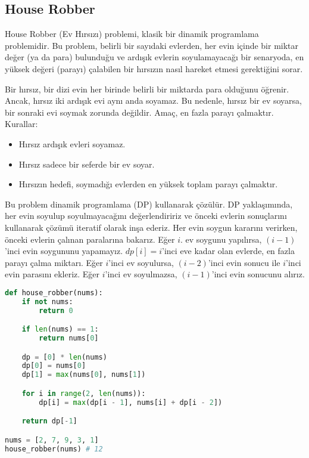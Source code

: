 \newpage

\subsection{House Robber}

House Robber (Ev Hırsızı) problemi, klasik bir dinamik programlama problemidir. Bu problem, belirli bir sayıdaki evlerden, her evin içinde bir miktar değer (ya da para) bulunduğu ve ardışık evlerin soyulamayacağı bir senaryoda, en yüksek değeri (parayı) çalabilen bir hırsızın nasıl hareket etmesi gerektiğini sorar.

Bir hırsız, bir dizi evin her birinde belirli bir miktarda para olduğunu öğrenir. Ancak, hırsız iki ardışık evi aynı anda soyamaz. Bu nedenle, hırsız bir ev soyarsa, bir sonraki evi soymak zorunda değildir. Amaç, en fazla parayı çalmaktır. Kurallar:

\begin{itemize}
    \item Hırsız ardışık evleri soyamaz.
    \item Hırsız sadece bir seferde bir ev soyar.
    \item Hırsızın hedefi, soymadığı evlerden en yüksek toplam parayı çalmaktır.
\end{itemize}

Bu problem dinamik programlama (DP) kullanarak çözülür. DP yaklaşımında, her evin soyulup soyulmayacağını değerlendiririz ve önceki evlerin sonuçlarını kullanarak çözümü iteratif olarak inşa ederiz. Her evin soygun kararını verirken, önceki evlerin çalınan paralarına bakarız. Eğer $i$. ev soygunu yapılırsa, $(i-1)$'inci evin soygununu yapamayız. $dp[i] = i$'inci eve kadar olan evlerde, en fazla parayı çalma miktarı. Eğer $i$'inci ev soyulursa, $(i-2)$'inci evin sonucu ile $i$'inci evin parasını ekleriz. Eğer $i$'inci ev soyulmazsa, $(i-1)$'inci evin sonucunu alırız.

\begin{lstlisting}[language=Python]
def house_robber(nums):
    if not nums:
        return 0

    if len(nums) == 1:
        return nums[0]

    dp = [0] * len(nums)
    dp[0] = nums[0]
    dp[1] = max(nums[0], nums[1])

    for i in range(2, len(nums)):
        dp[i] = max(dp[i - 1], nums[i] + dp[i - 2])

    return dp[-1]

nums = [2, 7, 9, 3, 1]
house_robber(nums) # 12
\end{lstlisting}

